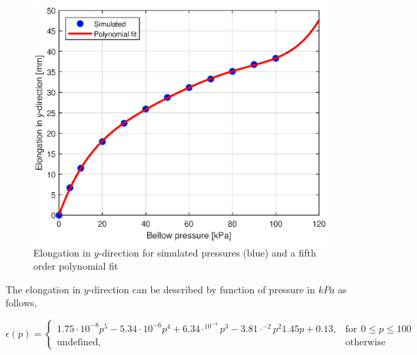 \begin{figure}[H]
    \centering
    \includegraphics{Figures/Chapter3/pvsy.eps}
    \caption{Elongation in $y$-direction for simulated pressures (blue) and a fifth order polynomial fit}
    \label{fig3:pvsy}
\end{figure}


The elongation in $y$-direction can be described by function of pressure in $kPa$ as follows,


\begin{equation}
    \epsilon(p) = 
    \begin{cases}
    1.75\cdot10^{-8}p^5	-5.34\cdot10^{-6}p^4 + 6.34\cdot^10^{-4}p^3	-3.81\cdot^{-2}p^2	1.45p	+0.13,& \text{for} \hspace{5pt} 0 \leq p \leq 100\\
    \text{undefined},              & \text{otherwise}
\end{cases}
\end{equation}